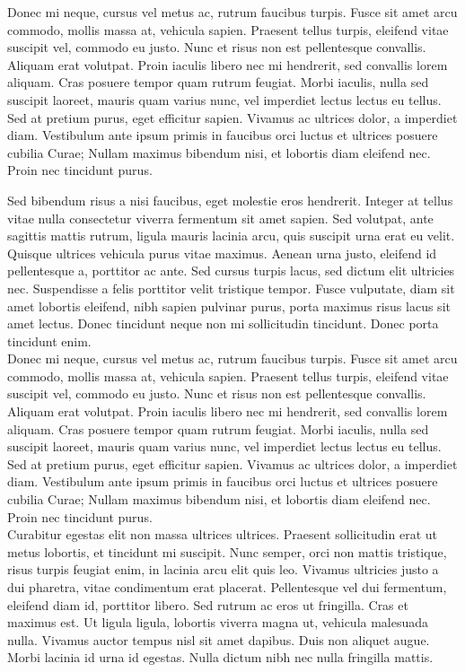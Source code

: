 Donec mi neque, cursus vel metus ac, rutrum faucibus turpis. Fusce sit amet arcu commodo, mollis massa at, vehicula sapien. Praesent tellus turpis, eleifend vitae suscipit vel, commodo eu justo. Nunc et risus non est pellentesque convallis. Aliquam erat volutpat. Proin iaculis libero nec mi hendrerit, sed convallis lorem aliquam. Cras posuere tempor quam rutrum feugiat. Morbi iaculis, nulla sed suscipit laoreet, mauris quam varius nunc, vel imperdiet lectus lectus eu tellus. Sed at pretium purus, eget efficitur sapien. Vivamus ac ultrices dolor, a imperdiet diam. Vestibulum ante ipsum primis in faucibus orci luctus et ultrices posuere cubilia Curae; Nullam maximus bibendum nisi, et lobortis diam eleifend nec. Proin nec tincidunt purus. 


Sed bibendum risus a nisi faucibus, eget molestie eros hendrerit. Integer at tellus vitae nulla consectetur viverra fermentum sit amet sapien. Sed volutpat, ante sagittis mattis rutrum, ligula mauris lacinia arcu, quis suscipit urna erat eu velit. Quisque ultrices vehicula purus vitae maximus. Aenean urna justo, eleifend id pellentesque a, porttitor ac ante. Sed cursus turpis lacus, sed dictum elit ultricies nec. Suspendisse a felis porttitor velit tristique tempor. Fusce vulputate, diam sit amet lobortis eleifend, nibh sapien pulvinar purus, porta maximus risus lacus sit amet lectus. Donec tincidunt neque non mi sollicitudin tincidunt. Donec porta tincidunt enim.
\\

Donec mi neque, cursus vel metus ac, rutrum faucibus turpis. Fusce sit amet arcu commodo, mollis massa at, vehicula sapien. Praesent tellus turpis, eleifend vitae suscipit vel, commodo eu justo. Nunc et risus non est pellentesque convallis. Aliquam erat volutpat. Proin iaculis libero nec mi hendrerit, sed convallis lorem aliquam. Cras posuere tempor quam rutrum feugiat. Morbi iaculis, nulla sed suscipit laoreet, mauris quam varius nunc, vel imperdiet lectus lectus eu tellus. Sed at pretium purus, eget efficitur sapien. Vivamus ac ultrices dolor, a imperdiet diam. Vestibulum ante ipsum primis in faucibus orci luctus et ultrices posuere cubilia Curae; Nullam maximus bibendum nisi, et lobortis diam eleifend nec. Proin nec tincidunt purus. 
\\

Curabitur egestas elit non massa ultrices ultrices. Praesent sollicitudin erat ut metus lobortis, et tincidunt mi suscipit. Nunc semper, orci non mattis tristique, risus turpis feugiat enim, in lacinia arcu elit quis leo. Vivamus ultricies justo a dui pharetra, vitae condimentum erat placerat. Pellentesque vel dui fermentum, eleifend diam id, porttitor libero. Sed rutrum ac eros ut fringilla. Cras et maximus est. Ut ligula ligula, lobortis viverra magna ut, vehicula malesuada nulla. Vivamus auctor tempus nisl sit amet dapibus. Duis non aliquet augue. Morbi lacinia id urna id egestas. Nulla dictum nibh nec nulla fringilla mattis.

